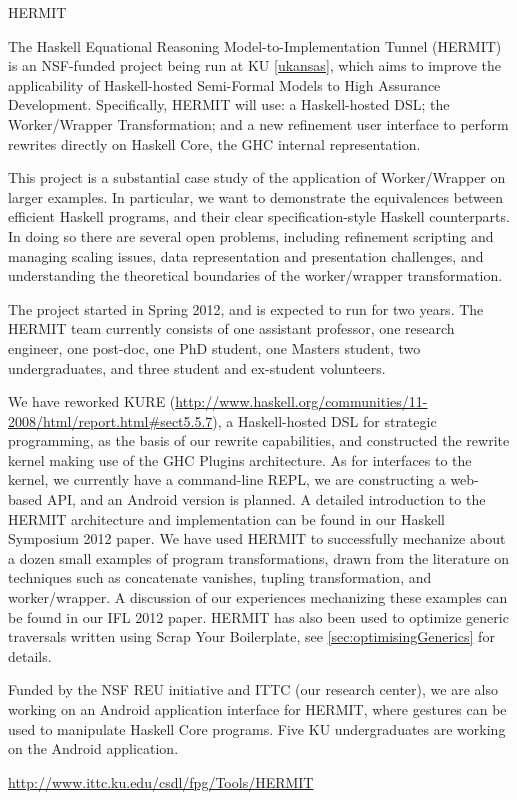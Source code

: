 \begin{hcarentry}[updated]{HERMIT}
\label{HERMIT}
\makeheader

The Haskell Equational Reasoning Model-to-Implementation Tunnel
(HERMIT) is an NSF-funded project being run at KU \cref{ukansas}, which aims to improve the
applicability of Haskell-hosted Semi-Formal Models to High Assurance Development.
Specifically, HERMIT will use: a Haskell-hosted DSL; the Worker/Wrapper Transformation;
and a new refinement user interface to perform rewrites directly on Haskell Core, the GHC internal representation.

This project is a substantial case study of the application of
Worker/Wrapper on larger examples. In particular, we want to
demonstrate the equivalences between efficient Haskell programs, and
their clear specification-style Haskell counterparts. In doing so
there are several open problems, including refinement scripting and
managing scaling issues, data representation and presentation
challenges, and understanding the theoretical boundaries of the
worker/wrapper transformation.

The project started in Spring 2012, and is expected to run for two years.
The HERMIT team currently consists of
one assistant professor, %
one research engineer, %
one post-doc, %
one PhD student, %
one Masters student, %
two undergraduates,
and three student and ex-student volunteers. %
%
%

We have reworked KURE (\url{http://www.haskell.org/communities/11-2008/html/report.html#sect5.5.7}), a Haskell-hosted DSL for strategic programming, as the basis of our rewrite capabilities, and constructed the rewrite kernel making use of the GHC Plugins architecture.
As for interfaces to the kernel, we currently have a command-line REPL, we are constructing a web-based API, and an Android version is planned.
A detailed introduction to the HERMIT architecture and implementation can be found in our Haskell Symposium 2012 paper.
We have used HERMIT to successfully mechanize about a dozen small examples of program transformations, drawn from the literature on techniques such as concatenate vanishes, tupling transformation, and worker/wrapper.
A discussion of our experiences mechanizing these examples can be found in our IFL 2012 paper.
HERMIT has also been used to optimize generic traversals written using Scrap Your Boilerplate, see \cref{sec:optimisingGenerics} for details.

Funded by the NSF REU initiative and ITTC (our research center),
we are also working on an Android application interface for HERMIT,
where gestures can be used to manipulate Haskell Core programs.
Five KU undergraduates are working on the Android application.

\FurtherReading
  \url{http://www.ittc.ku.edu/csdl/fpg/Tools/HERMIT}
\end{hcarentry}

